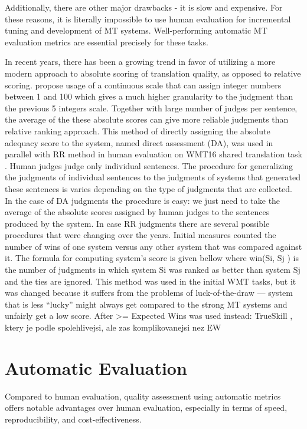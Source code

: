 Additionally, there are other major drawbacks - it is slow and expensive. For these reasons, it is literally impossible to use human evaluation for incremental tuning and development of MT systems. Well-performing automatic MT evaluation metrics are essential precisely for these tasks. 

In recent years, there has been a growing trend in favor of utilizing a more modern approach to absolute scoring of translation quality, as opposed to relative scoring. \cite{graham-etal-2013-continuous} propose usage of a continuous scale that can assign integer numbers between 1 and 100 which gives a much higher granularity to the judgment than the previous 5 integers scale. Together with large number of judges per sentence, the average of the these absolute scores can give more reliable judgments than relative ranking approach. This method of directly assigning the absolute adequacy score to the system, named direct assessment (DA), was used in parallel with RR method in human evaluation on WMT16 shared translation task \citep{wmt16}.
Human judges judge only individual sentences. The procedure for generalizing the judgments of individual sentences to the judgments of systems that generated these sentences is varies depending on the type of judgments that are collected. In the case of DA judgments the procedure is easy: we just need to take the average of the absolute scores assigned by human judges to the sentences produced by the system.
In case RR judgments there are several possible procedures that were changing over the years. Initial measures counted the number of wins of one system versus any other system that was compared against it. The formula for computing system’s score is given bellow where win(Si, Sj ) is the number of judgments in which system Si was ranked as better than system Sj and the ties are ignored. This method was used in the initial WMT tasks, but it was changed because it suffers from the problems of luck-of-the-draw — system that is less “lucky” might always get compared to the strong MT systems and unfairly get a low score. 
After >= Expected Wins \cite{koehn-2012-simulating} was used instead:
TrueSkill \citep{sakaguchi-etal-2014-efficient}, ktery je podle \citep{wmt14} spolehlivejsi, ale zas komplikovanejsi nez EW 


\section{Automatic Evaluation}
Compared to human evaluation, quality assessment using automatic metrics offers notable advantages over human evaluation, especially in terms of speed, reproducibility, and cost-effectiveness. 

